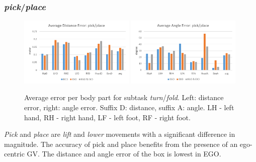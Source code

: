 \subsubsection{\textit{pick}/\textit{place}}
\begin{figure}[H]
	\centering
	\includegraphics[width=0.49\textwidth]{figures/distanceErrorPickPlace.png}
	\includegraphics[width=0.49\textwidth]{figures/angleErrorPickPlace.png}
	\caption[Average error per body part for subtask \textit{turn}/\textit{fold}.]{Average error per body part for subtask \textit{turn}/\textit{fold}. Left: distance error, right: angle error. Suffix D: distance, suffix A: angle. LH - left hand, RH - right hand, LF - left foot, RF - right foot.}
	\label{fig:errorPickPlace}
\end{figure}
\textit{Pick} and \textit{place} are \textit{lift} and \textit{lower} movements with a significant difference in magnitude. The accuracy of pick and place benefits from the presence of an ego-centric GV. The distance and angle error of the box is lowest in EGO.

